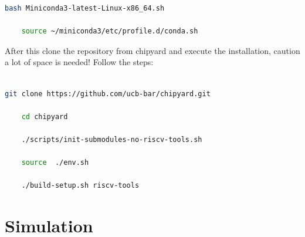 \documentclass{article}
\begin{document}
{\begin{lstlisting}[language=bash]
    bash Miniconda3-latest-Linux-x86_64.sh

    source ~/miniconda3/etc/profile.d/conda.sh
\end{lstlisting}
After this clone the repository from chipyard and execute the installation, caution a lot of space is needed! Follow the steps:\\\\
\begin{lstlisting}[language=bash]
    git clone https://github.com/ucb-bar/chipyard.git
	
	cd chipyard
	
	./scripts/init-submodules-no-riscv-tools.sh 
	
	source  ./env.sh
	
	./build-setup.sh riscv-tools
\end{lstlisting}


\section*{Simulation}
}
\end{document}
